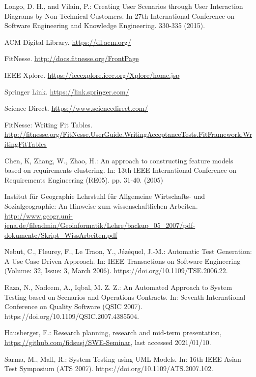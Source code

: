 \documentclass[a4paper,10pt, bibliography=totocnumbered]{scrreprt}
\begin{document}
\begin{thebibliography}{9}
 Longo, D. H., and Vilain, P.: Creating User Scenarios
through User Interaction Diagrams by Non-Technical
Customers. In 27th International Conference on Software
Engineering and Knowledge Engineering. 330-335 (2015).

 ACM Digital Library. \url{https://dl.acm.org/} 

 FitNesse. \url{http://docs.fitnesse.org/FrontPage}

 IEEE Xplore. \url{https://ieeexplore.ieee.org/Xplore/home.jsp}

 Springer Link. \url{https://link.springer.com/}

 Science Direct. \url{https://www.sciencedirect.com/}

 FitNesse: Writing Fit Tables. \url{http://fitnesse.org/FitNesse.UserGuide.WritingAcceptanceTests.FitFramework.WritingFitTables}


 Chen, K, Zhang, W., Zhao, H.: An approach to constructing feature models based on requirements clustering.
In: 13th IEEE International Conference on Requirements Engineering (RE05). pp. 31-40. (2005)

 Institut für Geographie   
Lehrstuhl für Allgemeine Wirtschafts- und Sozialgeographie: An Hinweise zum wissenschaftlichen Arbeiten.
\url{http://www.geogr.uni-jena.de/fileadmin/Geoinformatik/Lehre/backup_05_2007/pdf-dokumente/Skript_WissArbeiten.pdf}

 Nebut, C., Fleurey, F., Le Traon, Y., Jézéquel, J.-M.: Automatic Test Generation: A Use Case Driven Approach.
In: IEEE Transactions on Software Engineering (Volume: 32, Issue: 3, March 2006).
https://doi.org/10.1109/TSE.2006.22.

 Raza, N., Nadeem, A., Iqbal, M. Z. Z.: An Automated Approach to System Testing based on Scenarios and Operations Contracts.
In: Seventh International Conference on Quality Software (QSIC 2007).
https://doi.org/10.1109/QSIC.2007.4385504.

 Hausberger, F.: Research planning, research and mid-term presentation, \url{https://github.com/fidsusj/SWE-Seminar}, last accessed 2021/01/10.

 Sarma, M., Mall, R.: System Testing using UML Models.
In: 16th IEEE Asian Test Symposium (ATS 2007).
https://doi.org/10.1109/ATS.2007.102.


\end{thebibliography}
\end{document}
